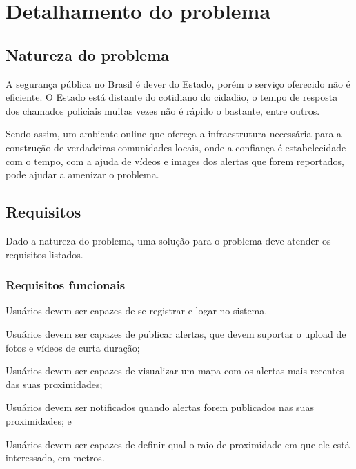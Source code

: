 \chapter{Detalhamento do problema}


\section{Natureza do problema}

A segurança pública no Brasil é dever do Estado, porém o serviço oferecido não é eficiente. O Estado está distante do cotidiano do cidadão, o tempo de resposta dos chamados policiais muitas vezes não é rápido o bastante, entre outros.

Sendo assim, um ambiente online que ofereça a infraestrutura necessária para a construção de verdadeiras comunidades locais, onde a confiança é estabelecidade com o tempo, com a ajuda de vídeos e images dos alertas que forem reportados, pode ajudar a amenizar o problema.

\section{Requisitos}
\label{s.requisitos}

Dado a natureza do problema, uma solução para o problema deve atender os requisitos listados.

\subsection{Requisitos funcionais}

\begin{alineas}
	\item Usuários devem ser capazes de se registrar e logar no sistema.
	\item Usuários devem ser capazes de publicar alertas, que devem suportar o upload de fotos e vídeos de curta duração;
 	\item Usuários devem ser capazes de visualizar um mapa com os alertas mais recentes das suas proximidades;
	\item Usuários devem ser notificados quando alertas forem publicados nas suas proximidades; e
	\item Usuários devem ser capazes de definir qual o raio de proximidade em que ele está interessado, em metros.
\end{alineas}


